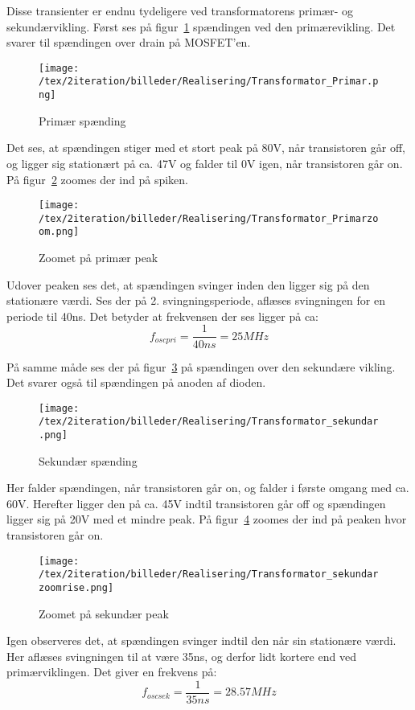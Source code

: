 Disse transienter er endnu tydeligere ved transformatorens primær- og sekundærvikling. Først ses på figur~\ref{fig: privolt} spændingen ved den primærevikling. Det svarer til spændingen over drain på MOSFET'en. 
\begin{figure}[H]
	\center
	\texttt{[image: /tex/2iteration/billeder/Realisering/Transformator\_Primar.png]}
	\caption{Primær spænding}
	\label{fig: privolt}
\end{figure}
Det ses, at spændingen stiger med et stort peak på 80V, når transistoren går off, og ligger sig stationært på ca. 47V og falder til 0V igen, når transistoren går on. På figur~\ref{fig: prizoom} zoomes der ind på spiken.
\begin{figure}[H]
	\center
	\texttt{[image: /tex/2iteration/billeder/Realisering/Transformator\_Primarzoom.png]}
	\caption{Zoomet på primær peak}
	\label{fig: prizoom}
\end{figure}
Udover peaken ses det, at spændingen svinger inden den ligger sig på den stationære værdi. Ses der på 2. svingningsperiode, aflæses svingningen for en periode til 40ns. Det betyder at frekvensen der ses ligger på ca:
\begin{equation} \label{svingpri}
f_{oscpri} = \frac{1}{40ns} = 25MHz
\end{equation}

På samme måde ses der på figur~\ref{fig:sek} på spændingen over den sekundære vikling. Det svarer også til spændingen på anoden af dioden. 
\begin{figure}[H]
	\center
	\texttt{[image: /tex/2iteration/billeder/Realisering/Transformator\_sekundar.png]}
	\caption{Sekundær spænding}
	\label{fig:sek}
\end{figure}
Her falder spændingen, når transistoren går on, og falder i første omgang med ca. 60V. Herefter ligger den på ca. 45V indtil transistoren går off og spændingen ligger sig på 20V med et mindre peak. På figur~\ref{fig:sekzoom} zoomes der ind på peaken hvor transistoren går on.
\begin{figure}[H]
	\center
	\texttt{[image: /tex/2iteration/billeder/Realisering/Transformator\_sekundarzoomrise.png]}
	\caption{Zoomet på sekundær peak}
	\label{fig:sekzoom}
\end{figure}
Igen observeres det, at spændingen svinger indtil den når sin stationære værdi. Her aflæses svingningen til at være 35ns, og derfor lidt kortere end ved primærviklingen. Det giver en frekvens på:
\begin{equation} \label{svingsek}
f_{oscsek} = \frac{1}{35ns} = 28.57MHz
\end{equation}

